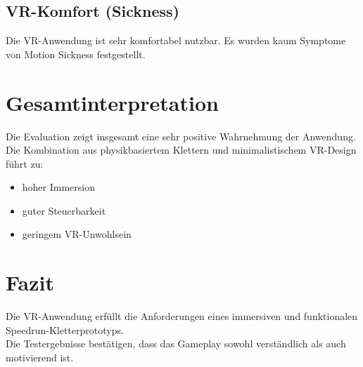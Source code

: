 \documentclass[11pt,a4paper]{article}
\begin{document}
\subsection{VR-Komfort (Sickness)}

\begin{center}
\end{center}
Die VR-Anwendung ist sehr komfortabel nutzbar. Es wurden kaum Symptome von Motion Sickness festgestellt.

\section{Gesamtinterpretation}

Die Evaluation zeigt insgesamt eine sehr positive Wahrnehmung der Anwendung.
\\
Die Kombination aus physikbasiertem Klettern und minimalistischem VR-Design führt zu:

\begin{itemize}
    \item hoher Immersion
    \item guter Steuerbarkeit
    \item geringem VR-Unwohlsein
\end{itemize}

\section{Fazit}

Die VR-Anwendung erfüllt die Anforderungen eines immersiven und funktionalen Speedrun-Kletterprototyps.
\\
Die Testergebnisse bestätigen, dass das Gameplay sowohl verständlich als auch motivierend ist.
\end{document}
